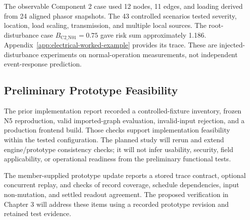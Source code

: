 The observable Component 2 case used 12 nodes, 11 edges, and loading
derived from 24 aligned phasor snapshots. The 43 controlled scenarios
tested severity, location, load scaling, transmission, and multiple local
sources. The root-disturbance case $B_{\mathrm{C2\_N01}}=0.75$ gave
risk sum approximately 1.186. Appendix~\ref{app:electrical-worked-example}
provides its trace. These are injected-disturbance experiments on
normal-operation measurements, not independent event-response prediction.

\subsection{Preliminary Prototype Feasibility}

The prior implementation report recorded a controlled-fixture inventory,
frozen N5 reproduction, valid imported-graph evaluation, invalid-input
rejection, and a production frontend build. Those checks support
implementation feasibility within the tested configuration. The planned
study will rerun and extend engine/prototype consistency checks; it will
not infer usability, security, field applicability, or operational
readiness from the preliminary functional tests.

The member-supplied prototype update reports a stored trace contract,
optional concurrent replay, and checks of record coverage, schedule
dependencies, input non-mutation, and settled readout agreement. The
proposed verification in Chapter 3 will address these items using a
recorded prototype revision and retained test evidence.

